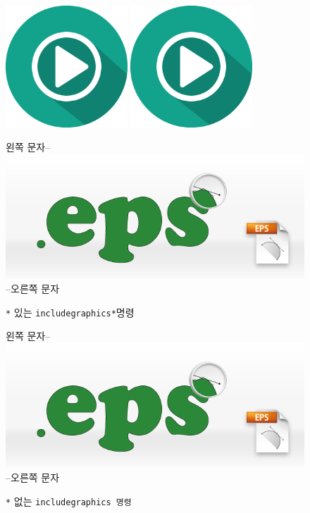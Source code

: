 \documentclass[11pt]{article}
\begin{document}
\begin{figure}[t]
\begin{center}
\includegraphics[width=1.8in]{play.png}
\includegraphics[width=1.8in, angle=-30]{play.png}
\end{center}
\end{figure}

\begin{figure}[t]
왼쪽 문자--
\includegraphics*[bb=14 64 70 85]{eps.png}
--오른쪽 문자
\caption{\texttt{*} 있는 \texttt{includegraphics*}명령 \label{fig:include*}}
\end{figure}

\begin{figure}[t]
왼쪽 문자--
\includegraphics*[bb=14 64 70 85]{eps.png}
--오른쪽 문자
\caption{\texttt{*} 없는 \texttt{includegraphics 명령 \label{fig:include0}}}
\end{figure}
\end{document}
